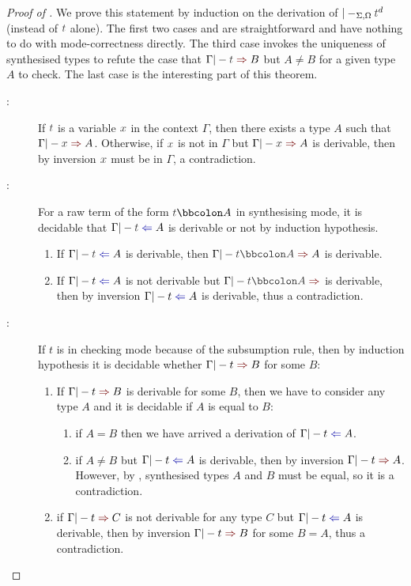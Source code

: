 \begin{proof}[Proof of {}]
  We prove this statement by induction on the derivation of $|-_{\Sigma, \Omega} \isTerm{t}^{d}$ (instead of $\isTerm{t}$ alone).
  The first two cases  and  are straightforward and have nothing to do with mode-correctness directly.
  The third case  invokes the uniqueness of synthesised types to refute the case that $\Gamma |- \isTerm{t} \syn B$ but $A \neq B$ for a given type $A$ to check.
  The last case  is the interesting part of this theorem.
  \begin{description}
    \item[:] If $\isTerm{t}$ is a variable $\isTerm{x}$ in the context $\Gamma$, then there exists a type $A$ such that $\Gamma |- \isTerm{x} \syn A$.
      Otherwise, if $\isTerm{x}$ is not in $\Gamma$ but $\Gamma |- \isTerm{x} \syn A$ is derivable, then by inversion $\isTerm{x}$ must be in $\Gamma$, a contradiction.
    \item[:] For a raw term of the form $\isTerm{t} \annotate A$ in synthesising mode, it is decidable that $\Gamma |- \isTerm{t} \chk A$ is derivable or not by induction hypothesis.
      \begin{enumerate}
        \item If $\Gamma |- \isTerm{t} \chk A$ is derivable, then $\Gamma |- \isTerm{t \annotate A} \syn A$ is derivable.
        \item If $\Gamma |- t \chk A$ is not derivable but $\Gamma |- \isTerm{t \annotate A} \syn$ is derivable, then by inversion $\Gamma |- t \chk A$ is derivable, thus a contradiction.
      \end{enumerate}
      
    \item[:] If $t$ is in checking mode because of the subsumption rule, then by induction hypothesis it is decidable whether $\Gamma |- t \syn B$ for some $B$:
      \begin{enumerate}
        \item If $\Gamma |- t \syn B$ is derivable for some $B$, then we have to consider any type $A$ and it is decidable if $A$ is equal to $B$:
          \begin{enumerate}
            \item if $A = B$ then we have arrived a derivation of $\Gamma |- t \chk A$.
            \item if $A \neq B$ but $\Gamma |- t \chk A$ is derivable, then by inversion $\Gamma |- t \syn A$.
              However, by , synthesised types $A$ and $B$ must be equal, so it is a contradiction.
          \end{enumerate}
        \item if $\Gamma |- t \syn C$ is not derivable for any type $C$ but $\Gamma |- t \chk A$ is derivable, then by inversion $\Gamma |- t \syn B$ for some $B = A$, thus a contradiction.
      \end{enumerate}
      

\end{description}
\end{proof}
